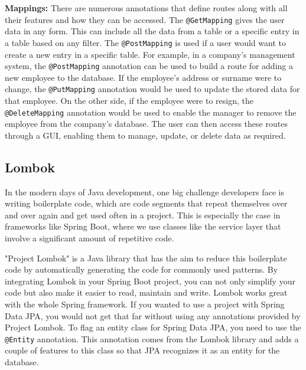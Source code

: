     \textbf{Mappings:} \newline
    There are numerous annotations that define routes along with all their features and how they can be accessed. The \texttt{@GetMapping} gives the user data in any form. This can include all the data from a table or a specific entry in a table based on any filter. The \texttt{@PostMapping} is used if a user would want to create a new entry in a specific table. \newline
    For example, in a company's management system, the \texttt{@PostMapping} annotation can be used to build a route for adding a new employee to the database. If the employee's address or surname were to change, the \texttt{@PutMapping} annotation would be used to update the stored data for that employee. On the other side, if the employee were to resign, the \texttt{@DeleteMapping} annotation would be used to enable the manager to remove the employee from the company's database. \newline
    The user can then access these routes through a GUI, enabling them to manage, update, or delete data as required. \Autocite{Andi:JPA}
    
    \subsection{Lombok}
    In the modern days of Java development, one big challenge developers face is writing boilerplate code, which are code segments that repeat themselves over and over again and get used often in a project. This is especially the case in frameworks like Spring Boot, where we use classes like the service layer that involve a significant amount of repetitive code.

    \blankLine

    "Project Lombok" is a Java library that has the aim to reduce this boilerplate code by automatically generating the code for commonly used patterns. By integrating Lombok in your Spring Boot project, you can not only simplify your code but also make it easier to read, maintain and write. 
    Lombok works great with the whole Spring framework. If you wanted to use a project with Spring Data JPA, you would not get that far without using any annotations provided by Project Lombok. To flag an entity class for Spring Data JPA, you need to use the \texttt{@Entity} annotation. This annotation comes from the Lombok library and adds a couple of 
    features to this class so that JPA recognizes it as an entity for the database.

